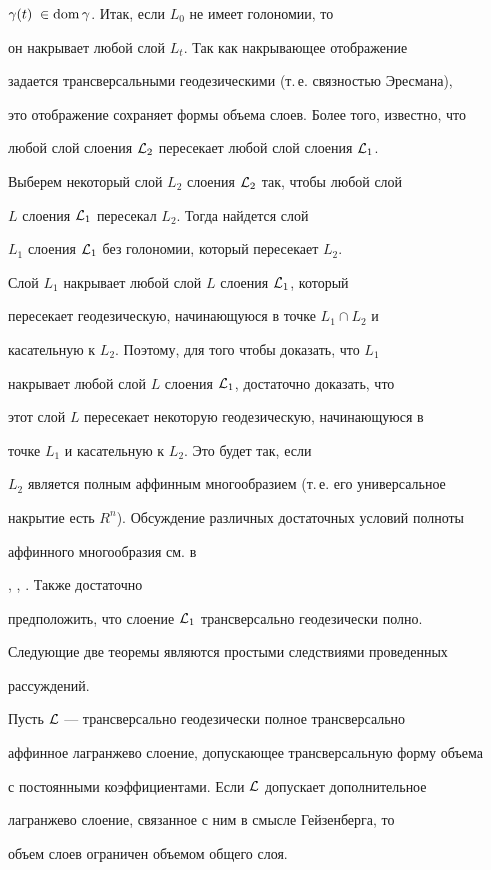 $\gamma(t)\; \in \operatorname{dom}\gamma $. Итак, если $L_0$ не имеет голономии, то


он накрывает любой слой $L_t$. Так как накрывающее отображение


задается трансверсальными геодезическими (т.\,е. связностью Эресмана),


это отображение сохраняет формы объема слоев. Более того, известно, что


любой слой слоения ${\cal L}_2$ пересекает любой слой слоения ${\cal L}_1$.


Выберем некоторый слой $L_2$ слоения ${\cal L}_2$ так, чтобы любой слой


$L$ слоения ${\cal L}_1$ пересекал $L_2$. Тогда найдется слой


$L_1$ слоения ${\cal L}_1$ без голономии, который пересекает $L_2$.


Слой $L_1$ накрывает любой слой $L$ слоения ${\cal L}_1$, который


пересекает геодезическую, начинающуюся в точке $L_1 \cap L_2$ и


касательную к $L_2$. Поэтому, для того чтобы доказать, что $L_1$


накрывает любой слой $L$ слоения ${\cal L}_1$, достаточно доказать, что


этот слой $L$ пересекает некоторую геодезическую, начинающуюся в


точке $L_1$ и касательную к $L_2$. Это будет так, если


$L_2$ является полным аффинным многообразием (т.\,е. его универсальное


накрытие есть $R^n$). Обсуждение различных достаточных условий полноты


аффинного многообразия см. в


\cite{FGH1}, \cite{GH1}, \cite{GH2}. Также достаточно


предположить, что слоение ${\cal L}_1$ трансверсально геодезически полно.


Следующие две теоремы являются простыми следствиями проведенных


рассуждений.





\begin{thm}


Пусть $\cal L$ --- трансверсально геодезически полное трансверсально


аффинное лагранжево слоение, допускающее трансверсальную форму объема


с постоянными коэффициентами. Если $\cal L$ допускает дополнительное


лагранжево слоение, связанное с ним в смысле Гейзенберга, то


объем слоев ограничен объемом общего слоя.


\end{thm}





